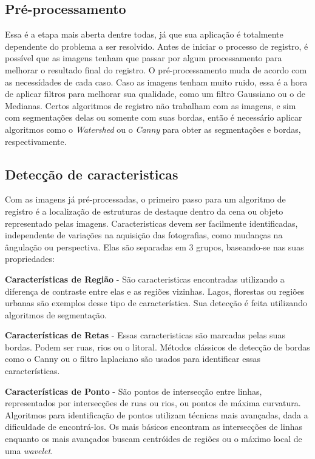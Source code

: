 \subsection{Pré-processamento}
    Essa é a etapa mais aberta dentre todas, já que sua aplicação é totalmente dependente do problema a ser resolvido. 
Antes de iniciar o processo de registro, é possível que as imagens tenham que passar por algum processamento para 
melhorar o resultado final do registro. O pré-processamento muda de acordo com as necessídades de cada caso. Caso as
imagens tenham muito ruido, essa é a hora de aplicar filtros para melhorar sua qualidade, como um filtro Gaussiano ou 
o de Medianas. Certos algoritmos de registro não trabalham com as imagens, e sim com segmentações delas ou somente com 
suas bordas, então é necessário aplicar algoritmos como o \textit{Watershed} ou o \textit{Canny} para obter as 
segmentações e bordas, respectivamente.

\subsection{Detecção de caracteristicas}
\label{sec:dec_corr_carac}

    Com as imagens já pré-processadas, o primeiro passo para um algoritmo de registro é a localização de estruturas de 
destaque dentro da cena ou objeto representado pelas imagens. Caracteristicas devem ser facilmente identificadas, 
independente de variações na aquisição das fotografias, como mudanças na ângulação ou perspectiva. 
Elas são separadas em 3 grupos, baseando-se nas suas propriedades:

\textbf{Características de Região} - São caracteristicas encontradas utilizando a diferença de contraste entre elas e
as regiões vizinhas. Lagos, florestas ou regiões urbanas são exemplos desse tipo de característica.
Sua detecção é feita utilizando algoritmos de segmentação.

\textbf{Características de Retas} - Essas caracteristicas são marcadas pelas suas bordas. Podem ser ruas, rios ou o 
litoral. Métodos clássicos de detecção de bordas como o Canny ou o filtro laplaciano são usados para identificar essas 
características.

\textbf{Características de Ponto} - São pontos de intersecção entre linhas, representados por intersecções de ruas ou
rios, ou pontos de máxima curvatura. Algoritmos para identificação de pontos utilizam técnicas mais avançadas, dada a 
dificuldade de encontrá-los. Os mais básicos encontram as intersecções de linhas enquanto os mais avançados buscam
centróides de regiões ou o máximo local de uma \textit{wavelet}.

